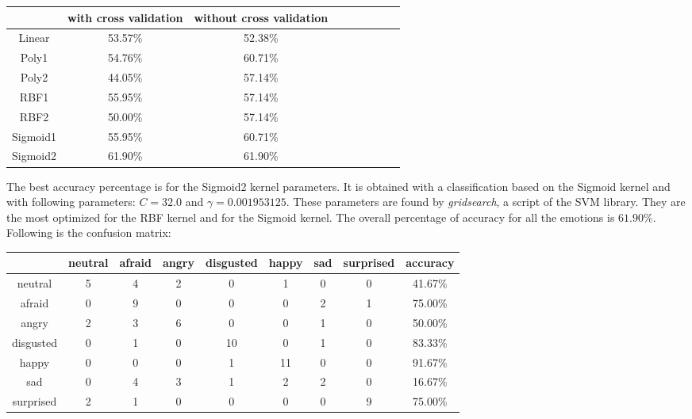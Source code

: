 \vspace{\baselineskip}
\begin {center}
\begin{tabular}{|c|c|c|c|c|c|c|c|c|}
  \hline
    & with cross validation & without cross validation \\
  \hline
  Linear & 53.57\% & 52.38\% \\
  Poly1 & 54.76\% & 60.71\% \\
  Poly2 & 44.05\% & 57.14\% \\
  RBF1 & 55.95\% & 57.14\% \\
  RBF2 & 50.00\% & 57.14\% \\
  Sigmoid1 & 55.95\% & 60.71\% \\
  Sigmoid2 & 61.90\% & 61.90\% \\
  \hline
\end{tabular}
\end {center}

\vspace{\baselineskip}
\vspace{\baselineskip}
\noindent The best accuracy percentage is for the Sigmoid2 kernel parameters. It is obtained with a classification based on the Sigmoid kernel and with following parameters: $ C = 32.0 $ and $ \gamma = 0.001953125 $. These parameters are found by \textit{gridsearch}, a script of the SVM library. They are the most optimized for the RBF kernel and for the Sigmoid kernel. The overall percentage of accuracy for all the emotions is $ 61.90\% $. Following is the confusion matrix:
\newline

\vspace{\baselineskip}
\begin {center}
\begin{tabular}{|c|c|c|c|c|c|c|c|c|}
  \hline
   & neutral & afraid & angry & disgusted & happy & sad & surprised & accuracy \\
  \hline
  neutral & 5 & 4 & 2 & 0 & 1 & 0 & 0 & 41.67\% \\
  afraid & 0 & 9 & 0 & 0 & 0 & 2 & 1 & 75.00\% \\
  angry & 2 & 3 & 6 & 0 & 0 & 1 & 0 & 50.00\% \\
  disgusted & 0 & 1 & 0 & 10 & 0 & 1 & 0 & 83.33\% \\
  happy & 0 & 0 & 0 & 1 & 11 & 0 & 0 & 91.67\% \\
  sad & 0 & 4 & 3 & 1 & 2 & 2 & 0 & 16.67\% \\
  surprised & 2 & 1 & 0 & 0 & 0 & 0 & 9 & 75.00\%\\
  \hline
\end{tabular}
\end {center}


